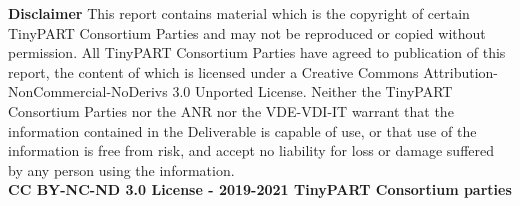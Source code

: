\begin{titlepage}
\begin{center}
					\textbf{Disclaimer}
					This report contains material which is the copyright of certain TinyPART Consortium Parties and may not be reproduced or copied without permission.
					All TinyPART Consortium Parties have agreed to publication of this report, the content of which is licensed under a Creative Commons Attribution-NonCommercial-NoDerivs 3.0 Unported License.
					Neither the TinyPART Consortium Parties nor the ANR nor the VDE-VDI-IT warrant that the information contained in the Deliverable is capable of use, or that use of the information is free from risk, and accept no liability for loss or damage suffered by any person using the information.\\ 
					
					
				\small \textbf{CC BY-NC-ND 3.0 License - 2019-2021 TinyPART Consortium parties}
			\end{center}
				

\end{titlepage}